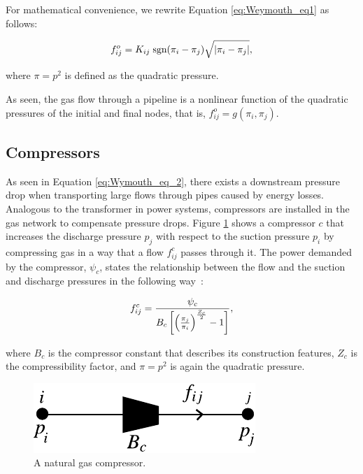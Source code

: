For mathematical convenience, we rewrite Equation \ref{eq:Weymouth_eq1} as follows:

\begin{equation}
	\label{eq:Wymouth_eq_2}
	f_{ij}^o = K_{ij} \;\text{sgn}(\pi_i - \pi_j)\sqrt{|\pi_i-\pi_j|},
	\vspace{0.3cm}
\end{equation}

\noindent where $\pi=p^2$ is defined as the quadratic pressure. 

As seen, the gas flow through a pipeline is a nonlinear function of the quadratic pressures of the initial and final nodes, that is, $f_{ij}^o=g(\pi_i,\pi_j)$. 

\subsection{Compressors}
\label{subsec:compressors}
As seen in Equation \ref{eq:Wymouth_eq_2}, there exists a downstream pressure drop when transporting large flows through pipes caused by energy losses. Analogous to the transformer in power systems, compressors are installed in the gas network to compensate pressure drops. Figure \ref{fig:compressor} shows a compressor $c$ that increases the discharge pressure $p_j$ with respect to the suction pressure $p_i$ by compressing gas in a way that a flow $f_{ij}^c$ passes through it. The power demanded by the compressor, $\psi_c$, states the relationship between the flow and the suction and discharge pressures in the following way~\cite{Shabanpour2016}:

\begin{equation}
	\label{eq:comp_flow}
	f_{ij}^c = \frac{\psi_c}{B_c \left[\left(\frac{\pi_j}{\pi_i}\right)^{\frac{Z_c}{2}}-1\right]},
	\vspace{0.3cm}
\end{equation}

where $B_c$ is the compressor constant that describes its construction features, $Z_c$ is the compressibility factor, and $\pi=p^2$ is again the quadratic pressure.

\begin{figure}[!ht]
	\centering
	\includegraphics[scale=0.9]{Figures/Compressor}
	\caption{A natural gas compressor.}	
	\label{fig:compressor}
\end{figure}

